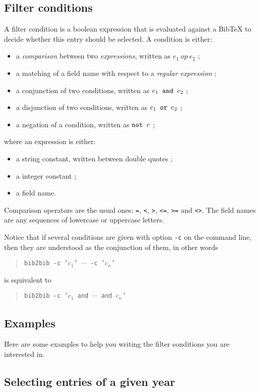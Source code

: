 \documentclass[11pt,a4paper]{article}
\begin{document}
\subsection{Filter conditions}

A filter condition is a boolean expression that is evaluated against
a BibTeX to decide whether this entry should be selected. A condition
is either:
\begin{itemize}
\item a \emph{comparison} between two \emph{expressions}, written as
  $e_1~op~e_2$ ; 
\item a matching of a field name with respect to a \emph{regular
    expression} ; 
\item a conjunction of two conditions, written as $c_1 \verb| and |
  c_2$ ;
\item a disjunction of two conditions, written as $c_1 \verb| or |
  c_2$ ;
\item a negation of a condition, written as $\verb|not | c$ ;
\end{itemize}
where an expression is either:
\begin{itemize}
\item a string constant, written between double quotes ;
\item a integer constant ;
\item a field name.
\end{itemize} 
Comparison operators are the usual ones: \texttt{=}, \texttt{<},
\texttt{>}, \texttt{<=}, \texttt{>=} and \texttt{<>}. The field names
are any sequences of lowercase or uppercase letters. 

Notice that if several conditions are given with option \verb|-c| on
the command line, then they are understood as the conjunction of them,
in other words
\begin{quote}
\texttt{bib2bib -c '$c_1$' $\cdots$ -c '$c_n$'}
\end{quote} 
is equivalent to
\begin{quote}
\texttt{bib2bib -c '$c_1$ and $\cdots$ and $c_n$'}
\end{quote} 

\subsection{Examples}

Here are some examples to help you writing the filter conditions you
are interested in.

\subsection{Selecting entries of a given year}
\end{document}
